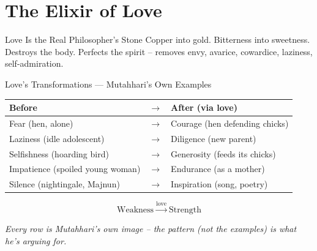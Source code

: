 \section{The Elixir of Love}

\begin{frame}{Love Is the Real Philosopher's Stone}
\footnotesize
{}
{\footnotesize Copper into gold. Bitterness into sweetness.}
{\footnotesize Destroys the body. Perfects the spirit -- removes envy, avarice, cowardice, laziness, self-admiration.}

\end{frame}


\begin{frame}{Love's Transformations --- Mutahhari's Own Examples}

\centering
\scriptsize
\renewcommand{\arraystretch}{1.35}

\begin{tabular}{|l|c|l|}
\hline
\textbf{Before} & \textbf{$\rightarrow$} & \textbf{After (via love)} \\
\hline
Fear (hen, alone) & $\rightarrow$ & Courage (hen defending chicks) \\
Laziness (idle adolescent) & $\rightarrow$ & Diligence (new parent) \\
Selfishness (hoarding bird) & $\rightarrow$ & Generosity (feeds its chicks) \\
Impatience (spoiled young woman) & $\rightarrow$ & Endurance (as a mother) \\
Silence (nightingale, Majnun) & $\rightarrow$ & Inspiration (song, poetry) \\
\hline
\end{tabular}

\vspace{0.4cm}

\large
\[
\boxed{\text{Weakness} \;\xrightarrow{\text{love}}\; \text{Strength}}
\]

\vspace{0.15cm}

\footnotesize
\textit{Every row is Mutahhari's own image -- the pattern (not the examples) is what he's arguing for.}

\end{frame}

